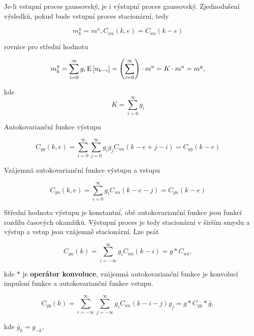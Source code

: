 Je-li vstupní proces gaussovský, je i výstupní proces gaussovský. Zjednodušení výsledků, pokud bude vstupní proces stacionární, tedy

\[ m_k^u = m^u, C_{uu}(k,e)=C_{uu}(k-e) \]

rovnice pro střední hodnotu

\[
m_k^y = \sum_{i=0}^\infty g_i\,\mathrm{E}\left[u_{k-i}\right]=\left(\sum_{i=0}^\infty\right)\cdot m^u = K\cdot m^u = m^y,
\]

kde 
\[ K=\sum_{i=0}^\infty g_i \]

Autokovarianční funkce výstupu

\[ C_{yy}(k,e) = \sum_{i=0}^\infty \sum_{j=0}^\infty g_i g_j C_{uu}(k-e+j-i)=C_{yy}(k-e) \]

Vzájemná autokovarianční funkce výstupu a vstupu

\[ C_{yu}(k,e) = \sum_{i=0}^\infty g_i C_{uu}(k-e-j)=C_{yu}(k-e) \]

Střední hodnota výstupu je konstantní, obě autokovarianční funkce jsou funkcí rozdílu časových okamžiků. Výstupní proces je tedy stacionární v širším smyslu a výstup a vstup jsou vzájemně stacionární. Lze psát

\[ C_{yu}(k) = \sum_{i=-\infty}^\infty g_i C_{uu}(k-i)= g * C_{uu}, \]

kde $*$ je \textbf{operátor konvoluce}, vzájemná autokovarianční funkce je konvolucí impulsní funkce a autokovarianční funkce vstupu.

\[ C_{yy}(k) = \sum_{i=-\infty}^\infty \sum_{j=-\infty}^\infty g_i C_{uu}(k-i-j)g_j=g * C_{yy} * \bar{g}, \]

kde $\bar{g}_k=g_{-k}$,